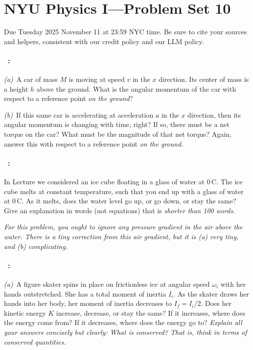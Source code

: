\documentclass[12pt]{article}
\begin{document}
\section*{NYU Physics I---Problem Set 10}

Due Tuesday 2025 November 11 at 23:59 NYC time. Be sure to cite your sources and helpers,
consistent with our credit policy and our LLM policy.

\paragraph{\problemname~\theproblem:}\label{cartorque}%
\textsl{(a)}~A car of mass $M$ is moving at speed $v$ in the $x$
direction. Its center of mass is a height $h$ above the ground.  What
is the angular momentum of the car with respect to a reference point
\emph{on the ground}?

\textsl{(b)}~If this same car is accelerating at acceleration $a$
in the $x$ direction, then its angular momentum is changing with time,
right? If so, there must be a net torque on the car? What must be
the magnitude of that net torque? Again, answer this with respect
to a reference point \emph{on the ground}.

\paragraph{\problemname~\theproblem:}%
In Lecture we considered an ice cube floating in a glass of water at
0\,C.  The ice cube melts at constant temperature, such that you end
up with a glass of water at 0\,C. As it melts, does the water level go
up, or go down, or stay the same? Give an explanation in words (not
equations) that is \emph{shorter than 100 words}.

\textsl{For this problem, you ought to ignore any pressure gradient in
  the air above the water. There is a tiny correction from this air
  gradient, but it is (a) very tiny, and (b) complicating.}

\paragraph{\problemname~\theproblem:}%
\textsl{(a)}~A figure skater spins in place on frictionless ice at
angular speed $\omega_i$ with her hands outstretched.  She has a total
moment of inertia $I_i$.  As the skater draws her hands into her body,
her moment of inertia decreases to $I_f=I_i/2$.  Does her kinetic
energy $K$ increase, decrease, or stay the same?  If it increases,
where does the energy come from?  If it decreases, where does the
energy go to?  \emph{Explain all your answers concisely but clearly:
What is conserved? That is, think in terms of conserved quantities.}
\end{document}
